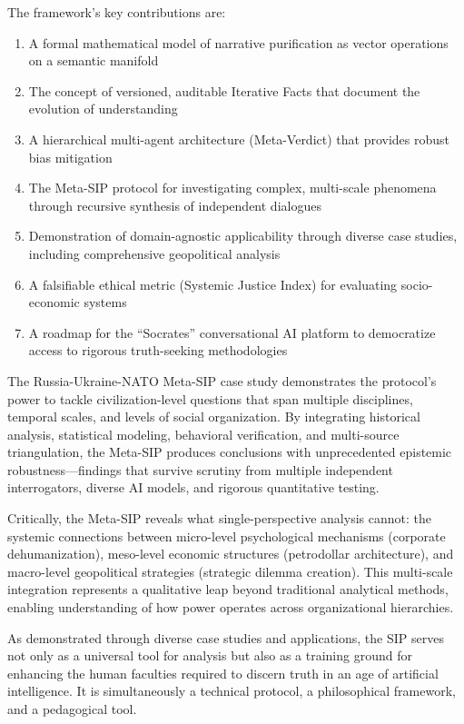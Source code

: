 \documentclass[11pt,a4paper]{article}
\begin{document}
The framework's key contributions are:
\begin{enumerate}[leftmargin=*]
    \item A formal mathematical model of narrative purification as vector operations on a semantic manifold
    \item The concept of versioned, auditable Iterative Facts that document the evolution of understanding
    \item A hierarchical multi-agent architecture (Meta-Verdict) that provides robust bias mitigation
    \item The Meta-SIP protocol for investigating complex, multi-scale phenomena through recursive synthesis of independent dialogues
    \item Demonstration of domain-agnostic applicability through diverse case studies, including comprehensive geopolitical analysis
    \item A falsifiable ethical metric (Systemic Justice Index) for evaluating socio-economic systems
    \item A roadmap for the ``Socrates'' conversational AI platform to democratize access to rigorous truth-seeking methodologies
\end{enumerate}

The Russia-Ukraine-NATO Meta-SIP case study demonstrates the protocol's power to tackle civilization-level questions that span multiple disciplines, temporal scales, and levels of social organization. By integrating historical analysis, statistical modeling, behavioral verification, and multi-source triangulation, the Meta-SIP produces conclusions with unprecedented epistemic robustness---findings that survive scrutiny from multiple independent interrogators, diverse AI models, and rigorous quantitative testing.

Critically, the Meta-SIP reveals what single-perspective analysis cannot: the systemic connections between micro-level psychological mechanisms (corporate dehumanization), meso-level economic structures (petrodollar architecture), and macro-level geopolitical strategies (strategic dilemma creation). This multi-scale integration represents a qualitative leap beyond traditional analytical methods, enabling understanding of how power operates across organizational hierarchies.

As demonstrated through diverse case studies and applications, the SIP serves not only as a universal tool for analysis but also as a training ground for enhancing the human faculties required to discern truth in an age of artificial intelligence. It is simultaneously a technical protocol, a philosophical framework, and a pedagogical tool.
\end{document}
